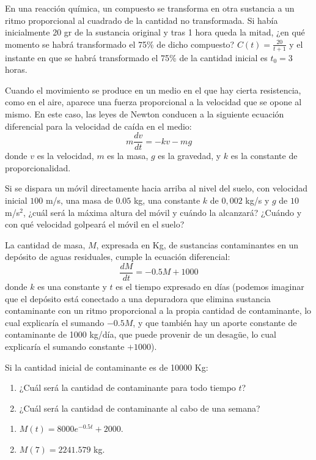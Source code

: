 {En una reacción química, un compuesto se transforma en otra sustancia a un ritmo proporcional al cuadrado de la
cantidad no transformada. Si había inicialmente 20 gr de la sustancia original y tras 1 hora queda la mitad, ¿en qué
momento se habrá transformado el 75\% de dicho compuesto?}
{$C(t)=\frac{20}{t+1}$ y el instante en que se habrá transformado el 75\% de la cantidad inicial es $t_0=3$ horas.
}
{}


{Cuando el movimiento se produce en un medio en el que hay cierta resistencia, como en el aire, aparece una fuerza
proporcional a la velocidad que se opone al mismo. En este caso, las leyes de Newton conducen a la siguiente ecuación
diferencial para la velocidad de caída en el medio:
\[
m\frac{{dv}} {{dt}} =  - kv - mg
\]
donde $v$ es la velocidad, $m$ es la masa, $g$ es la gravedad, y $k$ es la constante de proporcionalidad.

Si se dispara un móvil directamente hacia arriba al nivel del suelo, con velocidad inicial $100$ m/s, una masa de
$0.05$ kg, una constante $k$ de $0,002$ kg/s y $g$ de $10$ m/s$^2$, ¿cuál será la máxima altura del móvil y cuándo la
alcanzará? ¿Cuándo y con qué velocidad golpeará el móvil en el suelo?}
{
}
{}


{La cantidad de masa, $M$, expresada en Kg, de sustancias contaminantes en un depósito de aguas residuales, cumple la
ecuación diferencial:
\[
\frac{{dM}} {{dt}} =  - 0.5M + 1000
\]
donde $k$ es una constante y $t$ es el tiempo expresado en días (podemos imaginar que el depósito está conectado a una
depuradora que elimina sustancia contaminante con un ritmo proporcional a la propia cantidad de contaminante, lo cual
explicaría el sumando $-0.5M$, y que también hay un aporte constante de contaminante de 1000 kg/día, que puede provenir
de un desagüe, lo cual explicaría el sumando constante $+1000$).

Si la cantidad inicial de contaminante es de 10000 Kg:
\begin{enumerate}
\item ¿Cuál será la cantidad de contaminante para todo tiempo $t$?
\item ¿Cuál será la cantidad de contaminante al cabo de una semana?
\end{enumerate}
}
{\begin{enumerate}
\item $M(t)=8000e^{-0.5t}+2000$.
\item $M(7)=2241.579$ kg. 
\end{enumerate}
}
{}


